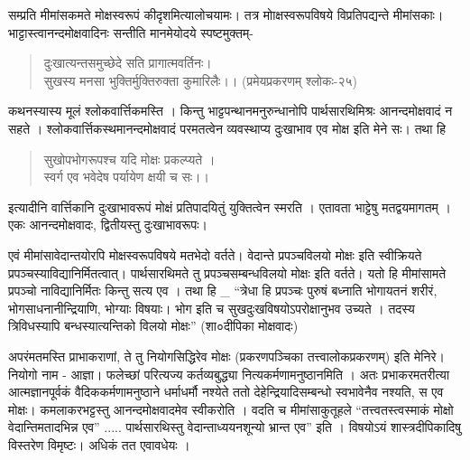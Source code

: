 सम्प्रति मीमांसकमते मोक्षस्वरूपं कीदृशमित्यालोचयामः। तत्र मोाक्षस्वरूपविषये विप्रतिपद्यन्ते मीमांसकाः। भाट्टास्त्वानन्दमोक्षवादिनः सन्तीति मानमेयोदये स्पष्टमुक्तम्-
\begin{verse}
दुःखात्यन्तसमुच्छेदे सति प्रागात्मवर्तिनः।\\
सुखस्य मनसा भुक्तिर्मुक्तिरुक्ता कुमारिलैः।। (प्रमेयप्रकरणम् श्लोकः-२५)
\end{verse}
कथनस्यास्य मूलं श्लोकवार्त्तिकमस्ति । किन्तु भाट्टपन्थानमनुरुन्धानोपि पार्थसारथिमिश्रः आनन्दमोक्षवादं न सहते । श्लोकवार्त्तिकस्थमानन्दमोक्षवादं परमतत्वेन व्यवस्थाप्य दुःखाभाव एव मोक्ष इति मेने सः। तथा हि
\begin{verse}
सुखोपभोगरूपश्च यदि मोक्षः प्रकल्प्यते ।\\
स्वर्ग एव भवेदेष पर्यायेण क्षयी च सः।।
\end{verse}
इत्यादीनि वार्त्तिकानि दुःखाभावरूपं मोक्षं प्रतिपादयितुं युक्तित्वेन स्मरति । एतावता भाट्टेषु मतद्वयमागतम् । एकः आनन्दमोक्षवादः, द्वितीयस्तु दुःखाभावरूपः।

एवं मीमांसावेदान्तयोरपि मोक्षस्वरूपविषये मतभेदो वर्तते। वेदान्ते प्रपञ्चविलयो मोक्षः इति स्वीक्रियते प्रपञ्चस्याविद्यानिर्मितत्वात्। पार्थसारथिमते तु प्रपञ्चसम्बन्धविलयो मोक्षः इति वर्तते। यतो हि मीमांसामते प्रपञ्चो नाविद्यानिर्मितः किन्तु सत्य एव । तथा हि _ “त्रेधा हि प्रपञ्चः पुरुषं बध्नाति भोगायतनं  शरीरं, भोगसाधनानीन्द्रियाणि, भोग्याः विषयाः। भोग इति च सुखदुःखविषयोऽपरोक्षानुभव उच्यते । तदस्य त्रिविधस्यापि बन्धस्यात्यन्तिको विलयो मोक्षः” (शा०दीपिका मोक्षवादः)

अपरंमतमस्ति प्राभाकराणां, ते तु नियोगसिद्धिरेव मोक्षः (प्रकरणपञ्चिका तत्त्वालोकप्रकरणम्) इति मेनिरे। नियोगो नाम - आज्ञा। फलेच्छां परित्यज्य कर्तव्यबुद्ध्या नित्यकर्मणामनुष्ठानमिति । अतः प्रभाकरमतरीत्या आत्मज्ञानपूर्वकं वैदिककर्मणामनुष्ठाने धर्माधर्मौ नश्येते ततो देहेन्द्रियादिसम्बन्धो स्वभावेनैव नश्यति, स एव मोक्षः। कमलाकरभट्टस्तु आनन्दमोक्षवादमेव स्वीकरोति । वदति च मीमांसाकुतूहले “तत्त्वतस्त्वस्माकं मोक्षो वेदान्तिमतादभिन्न एव” ..... पार्थसारथिस्तु वेदान्ताध्ययनशून्यो भ्रान्त एव” इति । विषयोऽयं शास्त्रदीपिकादिषु विस्तरेण विमृष्टः। अधिकं तत एवावधेयः ।

